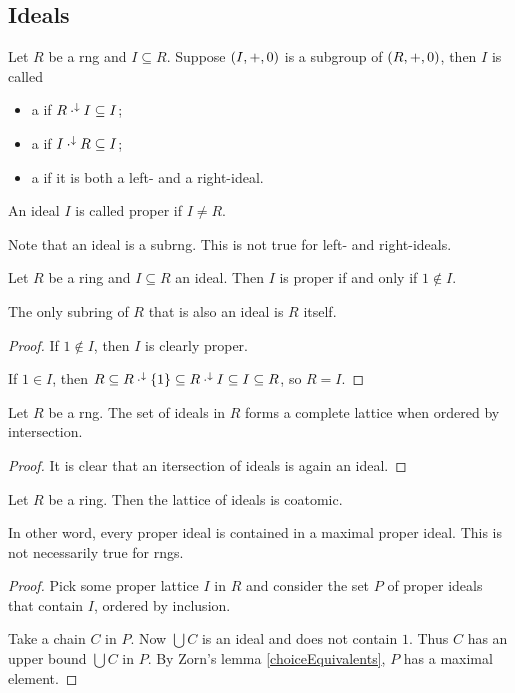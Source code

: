 \subsection{Ideals}
\begin{definition}
Let $R$ be a rng and $I\subseteq R$. Suppose $\left( I,+,0 \right)$ is a subgroup of $\left( R,+,0 \right)$, then $I$ is called
\begin{itemize}
\item a  if $R\cdot^\downarrow I \subseteq I$;
\item a  if $I\cdot^\downarrow R \subseteq I$;
\item a  if it is both a left- and a right-ideal.
\end{itemize}
An ideal $I$ is called proper if $I\neq R$.
\end{definition}
Note that an ideal is a subrng. This is not true for left- and right-ideals.

\begin{lemma} \label{properIdealNoUnit}
Let $R$ be a ring and $I\subseteq R$ an ideal. Then $I$ is proper \textup{if and only if} $1\notin I$.
\end{lemma}
The only subring of $R$ that is also an ideal is $R$ itself.
\begin{proof}
If $1\notin I$, then $I$ is clearly proper.

If $1\in I$, then $R \subseteq R\cdot^\downarrow\{1\} \subseteq R\cdot^\downarrow I \subseteq I \subseteq R$, so $R = I$.
\end{proof}

\begin{lemma}
Let $R$ be a rng. The set of ideals in $R$ forms a complete lattice when ordered by intersection.
\end{lemma}
\begin{proof}
It is clear that an itersection of ideals is again an ideal.
\end{proof}

\begin{proposition}  \label{idealLatticeCoatomic}
Let $R$ be a ring. Then the lattice of ideals is coatomic.
\end{proposition}
In other word, every proper ideal is contained in a maximal proper ideal. This is not necessarily true for rngs.
\begin{proof}
Pick some proper lattice $I$ in $R$ and consider the set $P$ of proper ideals that contain $I$, ordered by inclusion.

Take a chain $C$ in $P$. Now $\bigcup C$ is an ideal and does not contain $1$. Thus $C$ has an upper bound $\bigcup C$ in $P$. By Zorn's lemma \ref{choiceEquivalents}, $P$ has a maximal element.
\end{proof}


